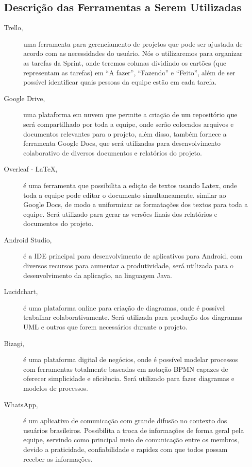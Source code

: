 \documentclass[12pt]{article}
\begin{document}
\subsection{Descrição das Ferramentas a Serem Utilizadas}
\begin{description}
\item[Trello,] uma ferramenta para gerenciamento de projetos que pode ser ajustada de acordo com as necessidades do usuário. Nós o utilizaremos para organizar as tarefas da Sprint, onde teremos colunas dividindo os cartões (que representam as tarefas) em “A fazer”, “Fazendo” e “Feito”, além de ser possível identificar quais pessoas da equipe estão em cada tarefa.
\\
\item[Google Drive,] uma plataforma em nuvem que permite a criação de um repositório que será compartilhado por toda a equipe, onde serão colocados arquivos e documentos relevantes para o projeto, além disso, também fornece a ferramenta Google Docs, que será utilizadas para desenvolvimento colaborativo de diversos documentos e relatórios do projeto.
\newline
\item[Overleaf - LaTeX,]\noindent é uma ferramenta que possibilita a edição de textos usando Latex, onde toda a equipe pode editar o documento simultaneamente, similar ao Google Docs, de modo a uniformizar as formatações dos textos para toda a equipe. Será utilizado para gerar as versões finais dos relatórios e documentos do projeto.
\newline
\item[Android Studio,]\noindent é a IDE principal para desenvolvimento de aplicativos para Android, com diversos recursos para aumentar a produtividade, será utilizada para o desenvolvimento da aplicação, na linguagem Java.
\newline
\item[Lucidchart,]\noindent é uma plataforma online para criação de diagramas, onde é possível trabalhar colaborativamente. Será utilizada para produção dos diagramas UML e outros que forem necessários durante o projeto.
\newline
\item[Bizagi,]\noindent  é uma plataforma digital de negócios, onde é possível modelar processos com ferramentas totalmente baseadas em notação BPMN capazes de oferecer simplicidade e eficiência. Será utilizado para fazer diagramas e modelos de processos.
\newline
 \item[WhatsApp,] \noindent  é um aplicativo de comunicação com grande difusão no contexto dos usuários brasileiros. Possibilita a troca de informações de forma geral pela equipe, servindo como principal meio de comunicação entre os membros, devido a praticidade, confiabilidade e rapidez com que todos possam receber as informações.
\end{description}
\end{document}
